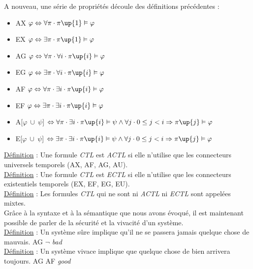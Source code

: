 \documentclass[runningheads,a4paper]{llncs}
\begin{document}
\noindent A nouveau, une série de propriétés découle des définitions précédentes : 
\begin{itemize}
\item AX $\varphi \Leftrightarrow \forall \pi \cdot \pi\up{1} \vDash \varphi$
\item EX $\varphi \Leftrightarrow \exists \pi \cdot \pi\up{1} \vDash \varphi$
\item AG $\varphi \Leftrightarrow \forall \pi \cdot \forall i \cdot \pi\up{i} \vDash \varphi$
\item EG $\varphi \Leftrightarrow \exists \pi \cdot \forall i \cdot \pi\up{i} \vDash \varphi$
\item AF $\varphi \Leftrightarrow \forall \pi \cdot \exists i \cdot \pi\up{i} \vDash \varphi$
\item EF $\varphi \Leftrightarrow \exists \pi \cdot \exists i \cdot \pi\up{i} \vDash \varphi$
\item A[$\varphi \ \cup \ \psi$]  $\Leftrightarrow \forall \pi \cdot \exists i \cdot \pi\up{i} \vDash 	\psi \land \forall j \cdot 0 \leq j < i \Rightarrow \pi\up{j} \vDash \varphi$
\item E[$\varphi \ \cup \ \psi$]  $\Leftrightarrow \exists \pi \cdot \exists i \cdot \pi\up{i} \vDash 	\psi \land \forall j \cdot 0 \leq j < i \Rightarrow \pi\up{j} \vDash \varphi$ \\
\end{itemize}

\noindent \underline{Définition} : Une formule \textit{CTL} est \textit{ACTL} si elle n'utilise que les connecteurs universels temporels (AX, AF, AG, AU).\\
\underline{Définition} : Une formule \textit{CTL} est \textit{ECTL} si elle n'utilise que les connecteurs existentiels temporels (EX, EF, EG, EU).\\
\underline{Définition} : Les formules \textit{CTL} qui ne sont ni \textit{ACTL} ni \textit{ECTL} sont appelées mixtes.\\

\noindent Grâce à la syntaxe et à la sémantique que nous avons évoqué, il est maintenant possible de parler de la sécurité et la vivacité d'un système.\\

\noindent \underline{Définition} : Un système sûre implique qu'il ne se passera jamais quelque chose de mauvais. AG $\lnot$ \textit{bad} \\
\underline{Définition} : Un système vivace implique que quelque chose de bien arrivera toujours. AG AF \textit{good}
\end{document}
